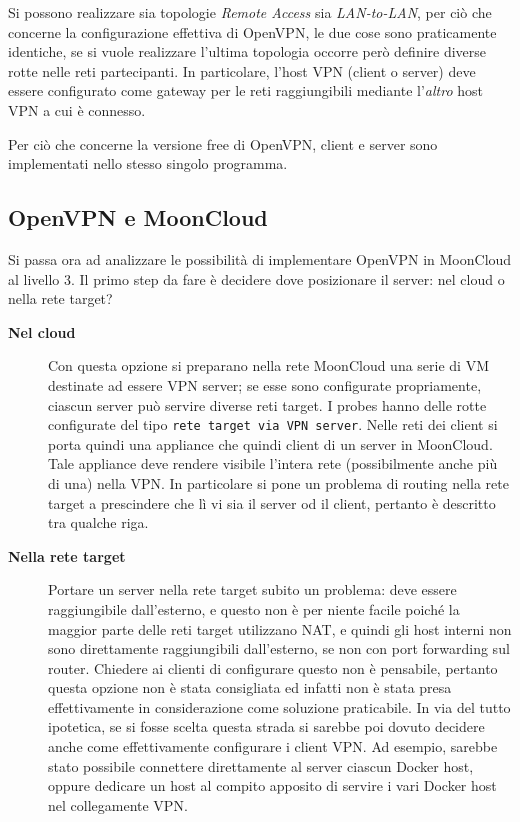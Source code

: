 Si possono realizzare sia topologie \textit{Remote Access} sia \textit{LAN-to-LAN},
per ciò che concerne la configurazione effettiva di OpenVPN, le due cose
sono praticamente identiche, se si vuole realizzare l'ultima topologia occorre
però definire diverse rotte nelle reti partecipanti. In particolare,
l'host VPN (client o server) deve essere configurato come gateway per le reti
raggiungibili mediante l'\textit{altro} host VPN a cui è connesso.

Per ciò che concerne la versione free di OpenVPN, client e server sono implementati
nello stesso singolo programma.

\subsection{OpenVPN e MoonCloud}
Si passa ora ad analizzare le possibilità di implementare OpenVPN in MoonCloud al livello 3. Il primo step
da fare è decidere dove posizionare il server: nel cloud o nella rete target?
\begin{description}
  \item[\textbf{Nel cloud}]Con questa opzione si preparano nella rete MoonCloud una serie
  di VM destinate ad essere VPN server; se esse sono configurate propriamente, ciascun server
  può servire diverse reti target. I probes
  hanno delle rotte configurate del tipo \texttt{rete target via VPN server}.
  Nelle reti dei client si porta quindi una appliance che quindi client di un server in MoonCloud.
  Tale appliance deve rendere visibile l'intera rete (possibilmente anche più di una) nella VPN. In
  particolare si pone un problema di routing nella rete target a prescindere che lì vi sia
  il server od il client, pertanto è descritto tra qualche riga.
  \item[\textbf{Nella rete target}]Portare un server nella rete target subito un problema: deve
  essere raggiungibile dall'esterno, e questo non è per niente facile poiché la maggior parte
  delle reti target utilizzano NAT, e quindi gli host interni non sono direttamente raggiungibili
  dall'esterno, se non con port forwarding sul router. Chiedere ai clienti di configurare
  questo non è pensabile, pertanto questa opzione non è stata consigliata ed infatti
  non è stata presa effettivamente in considerazione come soluzione praticabile.
  In via del tutto ipotetica, se si fosse scelta questa strada si sarebbe poi
  dovuto decidere anche come effettivamente configurare i client VPN. Ad esempio,
  sarebbe stato possibile connettere direttamente al server ciascun Docker host, oppure
  dedicare un host al compito apposito di servire i vari Docker host nel collegamente VPN.
\end{description}

